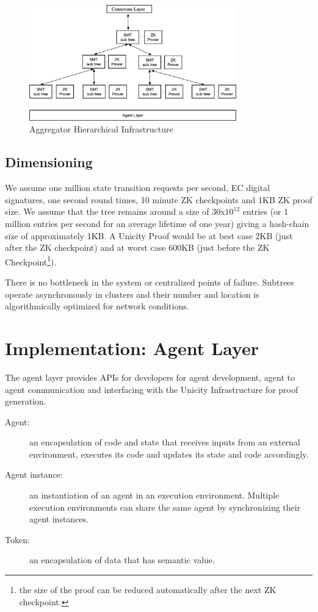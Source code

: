 \documentclass{article}
\begin{document}
\begin{figure}[htbp]
    \centering
    \includegraphics[width=0.8\textwidth]{SMT-Infra.png}
    \caption{Aggregator Hierarchical Infrastructure}
    \label{fig:SMT-Infra}
\end{figure}

\subsection{Dimensioning}

We assume one million state transition requests per second, EC digital signatures, one second round times, 10 minute ZK checkpoints and 1KB ZK proof size. We assume that the tree remains around a size of 30x$10^{12}$ entries (or 1 million entries per second for an average lifetime of one year) giving a hash-chain size of approximately 1KB.
A Unicity Proof would be at best case 2KB (just after the ZK checkpoint) and at worst case 600KB (just before the ZK Checkpoint\footnote{the size of the proof can be reduced automatically after the next ZK checkpoint.}).

There is no bottleneck in the system or centralized points of failure. Subtrees operate asynchronously in clusters and their number and location is algorithmically optimized for network conditions.

\section{Implementation: Agent Layer}

The agent layer provides APIs for developers for agent development, agent to agent communication and interfacing with the Unicity Infrastructure for proof generation.

\begin{description}
    \item[Agent:] an encapsulation of code and state that receives inputs from an external environment, executes its code and updates its state and code accordingly.
    \item[Agent instance:] an instantiation of an agent in an execution environment. Multiple execution environments can share the same agent by synchronizing their agent instances.
    \item[Token:] an encapsulation of data that has semantic value.
\end{description}
\end{document}
